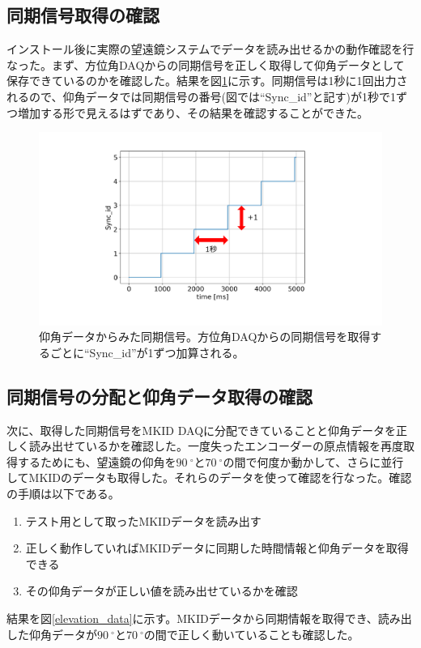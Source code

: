\subsection{同期信号取得の確認}
インストール後に実際の望遠鏡システムでデータを読み出せるかの動作確認を行なった。まず、方位角DAQからの同期信号を正しく取得して仰角データとして保存できているのかを確認した。結果を図\ref{sync_id}に示す。同期信号は1秒に1回出力されるので、仰角データでは同期信号の番号(図では``Sync\_id''と記す)が1秒で1ずつ増加する形で見えるはずであり、その結果を確認することができた。

\begin{figure}[htbp]
  \centering
  \includegraphics[width=0.8\columnwidth]{4_elDAQ/figs/sync_id.pdf}
  \caption{仰角データからみた同期信号。方位角DAQからの同期信号を取得するごとに``Sync\_id''が1ずつ加算される。}
  \label{sync_id}
\end{figure}

\subsection{同期信号の分配と仰角データ取得の確認}
次に、取得した同期信号をMKID DAQに分配できていることと仰角データを正しく読み出せているかを確認した。一度失ったエンコーダーの原点情報を再度取得するためにも、望遠鏡の仰角を$\SI{90}{^{\circ}}$と$\SI{70}{^{\circ}}$の間で何度か動かして、さらに並行してMKIDのデータも取得した。それらのデータを使って確認を行なった。確認の手順は以下である。
\begin{enumerate}
  \item テスト用として取ったMKIDデータを読み出す
  \item 正しく動作していればMKIDデータに同期した時間情報と仰角データを取得できる
  \item その仰角データが正しい値を読み出せているかを確認
\end{enumerate}

結果を図\ref{elevation_data}に示す。MKIDデータから同期情報を取得でき、読み出した仰角データが$\SI{90}{^{\circ}}$と$\SI{70}{^{\circ}}$の間で正しく動いていることも確認した。

